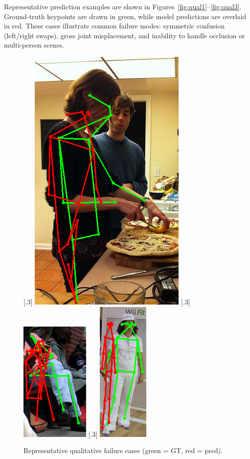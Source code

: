 Representative prediction examples are shown in Figures~\ref{fig:qual1}–\ref{fig:qual3}. Ground-truth keypoints are drawn in green, while model predictions are overlaid in red. These cases illustrate common failure modes: symmetric confusion (left/right swaps), gross joint misplacement, and inability to handle occlusion or multi-person scenes.

\begin{figure}[!htbp]
  \centering
  [.3\textwidth]{%
    \includegraphics[width=.2\textwidth]{figures/qualitative_case1.png}%
  }\hfill
  [.3\textwidth]{%
    \includegraphics[width=.2\textwidth]{figures/qualitative_case2.png}%
  }\hfill
  [.3\textwidth]{%
    \includegraphics[width=.13\textwidth]{figures/qualitative_case3.png}%
  }

  \caption{Representative qualitative failure cases (green = GT, red = pred).}
  \label{fig:qualitative_all}
\end{figure}